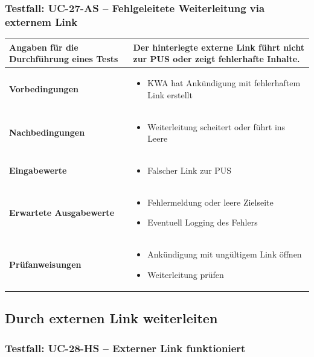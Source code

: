 \documentclass[a4paper,12pt]{article}
\begin{document}
\vspace{1.5cm}



\subsubsection{Testfall: UC-27-AS – Fehlgeleitete Weiterleitung via externem Link}
\begin{tabular}{|p{5cm}|p{10.5cm}|}
\hline
\textbf{Angaben für die Durchführung eines Tests} & Der hinterlegte externe Link führt nicht zur PUS oder zeigt fehlerhafte Inhalte. \\
\hline
\textbf{Vorbedingungen} & 
\begin{itemize}[leftmargin=*]
  \item KWA hat Ankündigung mit fehlerhaftem Link erstellt
\end{itemize} \\
\hline
\textbf{Nachbedingungen} & 
\begin{itemize}[leftmargin=*]
  \item Weiterleitung scheitert oder führt ins Leere
\end{itemize} \\
\hline
\textbf{Eingabewerte} &
\begin{itemize}[leftmargin=*]
  \item Falscher Link zur PUS
\end{itemize} \\
\hline
\textbf{Erwartete Ausgabewerte} & 
\begin{itemize}[leftmargin=*]
  \item Fehlermeldung oder leere Zielseite
  \item Eventuell Logging des Fehlers
\end{itemize} \\
\hline
\textbf{Prüfanweisungen} &
\begin{itemize}[leftmargin=*]
  \item Ankündigung mit ungültigem Link öffnen
  \item Weiterleitung prüfen
\end{itemize} \\
\hline
\end{tabular}

\subsection{Durch externen Link weiterleiten}

\subsubsection{Testfall: UC-28-HS – Externer Link funktioniert}
\vspace{0.5cm}
\end{document}
